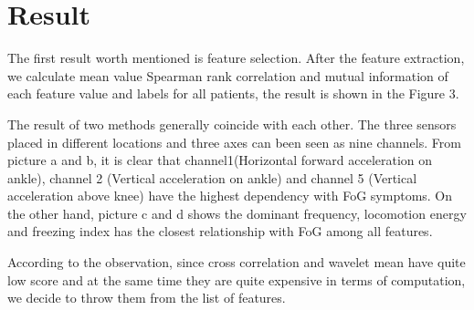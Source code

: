 \documentclass[article]{article}
\begin{document}
	
\section{Result}
    
	The first result worth mentioned is feature selection.
    After the feature extraction, we calculate mean value Spearman rank correlation and mutual information of each feature value and labels for all patients, the result is shown in the Figure 3. 
    
    The result of two methods generally coincide with each other. The three sensors placed in different locations and three axes can been seen as nine channels. From picture a and b, it is clear that channel1(Horizontal forward acceleration on ankle), channel 2 (Vertical acceleration on ankle) and channel 5 (Vertical acceleration above knee) have the highest dependency with FoG symptoms. On the other hand, picture c and d shows the dominant frequency, locomotion energy and freezing index has the closest relationship with FoG among all features.
    
    According to the observation, since cross correlation and wavelet mean have quite low score and at the same time  they are quite expensive in terms of computation, we decide to throw them from the list of features.
    
\end{document}
